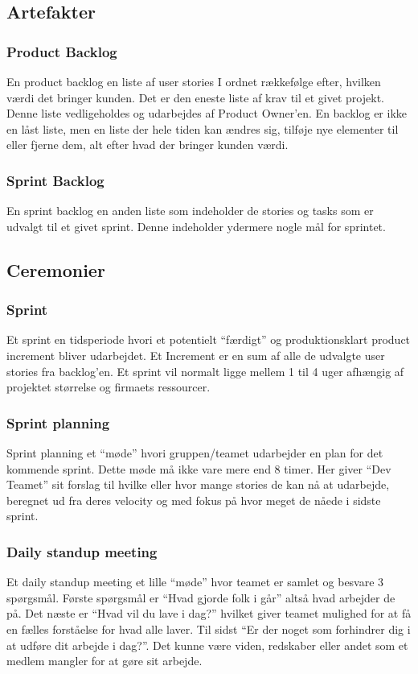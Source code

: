 \subsection{Artefakter}
\subsubsection{Product Backlog}
En product backlog en liste af user stories I ordnet rækkefølge efter, hvilken værdi det bringer kunden. 
Det er den eneste liste af krav til et givet projekt. Denne liste vedligeholdes og udarbejdes af 
Product Owner’en. En backlog er ikke en låst liste, men en liste der hele tiden kan ændres sig, 
tilføje nye elementer til eller fjerne dem, alt efter hvad der bringer kunden værdi. 

\subsubsection{Sprint Backlog}
En sprint backlog en anden liste som indeholder de stories og tasks som er udvalgt til et givet sprint. Denne indeholder
ydermere nogle mål for sprintet. 

\subsection{Ceremonier}
\subsubsection{Sprint}
Et sprint en tidsperiode hvori et potentielt “færdigt” og produktionsklart product increment bliver udarbejdet. 
Et Increment er en sum af alle de udvalgte user stories fra backlog'en. Et sprint vil normalt ligge mellem 1 til 4 uger 
afhængig af projektet størrelse og firmaets ressourcer.

\subsubsection{Sprint planning}
Sprint planning et “møde” hvori gruppen/teamet udarbejder en plan for det kommende sprint. Dette møde må ikke vare mere end 8 timer. 
Her giver “Dev Teamet” sit forslag til hvilke eller hvor mange stories de kan nå at udarbejde, beregnet ud fra deres velocity 
og med fokus på hvor meget de nåede i sidste sprint.

\subsubsection{Daily standup meeting}
Et daily standup meeting et lille “møde” hvor teamet er samlet og besvare 3 spørgsmål. Første spørgsmål er “Hvad gjorde folk i går” 
altså hvad arbejder de på. Det næste er “Hvad vil du lave i dag?” hvilket giver teamet mulighed for at få en fælles 
forståelse for hvad alle laver. Til sidst “Er der noget som forhindrer dig i at udføre dit arbejde i dag?”. 
Det kunne være viden, redskaber eller andet som et medlem mangler for at gøre sit arbejde.

